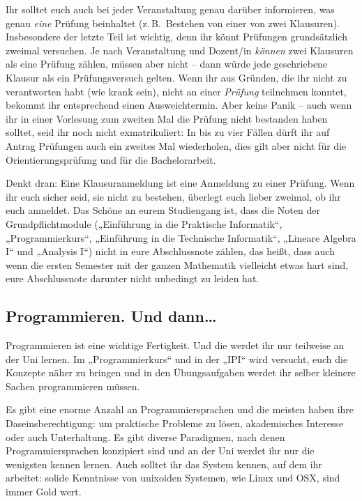 Ihr solltet euch auch bei jeder Veranstaltung genau darüber informieren, was genau \emph{eine} Prüfung beinhaltet (z.\,B.\ Bestehen von einer von zwei Klausuren). Insbesondere der letzte Teil ist wichtig, denn ihr könnt Prüfungen grundsätzlich zweimal versuchen. Je nach Veranstaltung und Dozent/in \emph{können} zwei Klausuren als eine Prüfung zählen, müssen aber nicht -- dann würde jede geschriebene Klausur als ein Prüfungsversuch gelten. Wenn ihr aus Gründen, die ihr nicht zu verantworten habt (wie krank sein), nicht an einer \emph{Prüfung} teilnehmen konntet, bekommt ihr entsprechend einen Ausweichtermin. Aber keine Panik -- auch wenn ihr in einer Vorlesung zum zweiten Mal die Prüfung nicht bestanden haben solltet, seid ihr noch nicht exmatrikuliert: In bis zu vier Fällen dürft ihr auf Antrag Prüfungen auch ein zweites Mal wiederholen, dies gilt aber nicht für die Orientierungsprüfung und für die Bachelorarbeit.

Denkt dran: Eine Klausuranmeldung ist eine Anmeldung zu einer Prüfung. Wenn ihr euch sicher seid, sie nicht zu bestehen, überlegt euch lieber zweimal, ob ihr euch anmeldet. Das Schöne an eurem Studiengang ist, dass die Noten der Grundpflichtmodule („Einführung in die Praktische Informatik“, „Programmierkurs“, „Einführung in die Technische Informatik“, „Lineare Algebra I“ und „Analysis I“) nicht in eure Abschlussnote zählen, das heißt, dass auch wenn die ersten Semester mit der ganzen Mathematik vielleicht etwas hart sind, eure Abschlussnote darunter nicht unbedingt zu leiden hat.
\subsection{Programmieren. Und dann\dots}

Programmieren ist eine wichtige Fertigkeit. Und die werdet ihr nur teilweise an der Uni lernen. Im „Programmierkurs“ und in der „IPI“ wird versucht, euch die Konzepte näher zu bringen und in den Übungsaufgaben werdet ihr selber kleinere Sachen programmieren müssen.

Es gibt eine enorme Anzahl an Programmiersprachen und die meisten haben ihre Daseinsberechtigung: um praktische Probleme zu lösen, akademisches Interesse oder auch Unterhaltung. Es gibt diverse Paradigmen, nach denen Programmiersprachen konzipiert sind und an der Uni werdet ihr nur die wenigsten kennen lernen. Auch solltet ihr das System kennen, auf dem ihr arbeitet: solide Kenntnisse von unixoiden Systemen, wie Linux und OSX, sind immer Gold wert.

